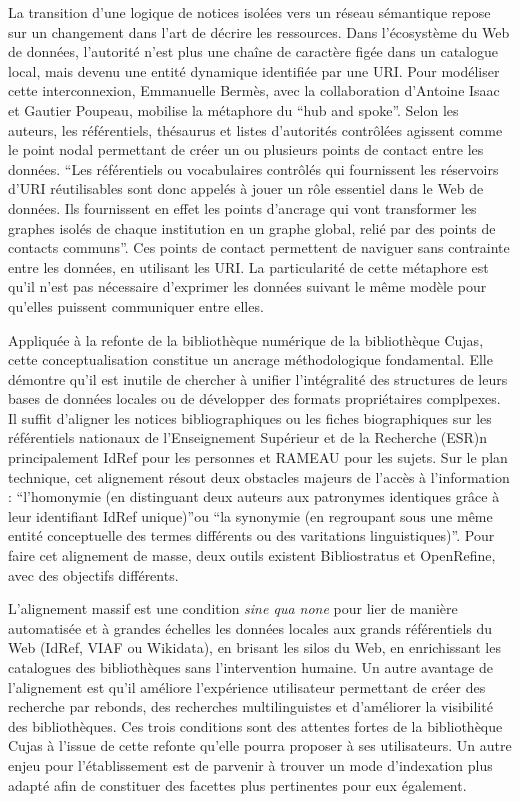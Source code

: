 La transition d'une logique de notices isolées vers un réseau sémantique repose sur un changement dans l'art de décrire les ressources. Dans l'écosystème du Web de données, l'autorité n'est plus une chaîne de caractère figée dans un catalogue local, mais devenu une entité dynamique identifiée par une URI. Pour modéliser cette interconnexion, Emmanuelle Bermès, avec la collaboration d'Antoine Isaac et Gautier Poupeau, mobilise la métaphore du \enquote{hub and spoke}. Selon les auteurs, les référentiels, thésaurus et listes d'autorités contrôlées agissent comme le point nodal permettant de créer un ou plusieurs points de contact entre les données. \enquote{Les référentiels ou vocabulaires contrôlés qui fournissent les réservoirs d’URI réutilisables sont donc appelés à jouer un rôle essentiel dans le Web de données. Ils fournissent en effet les points d’ancrage qui vont transformer les graphes isolés de chaque institution en un graphe global, relié par des points de contacts communs}. Ces points de contact permettent de naviguer sans contrainte entre les données, en utilisant les URI. La particularité de cette métaphore est qu'il n'est pas nécessaire d'exprimer les données suivant le même modèle pour qu'elles puissent communiquer entre elles.

Appliquée à la refonte de la bibliothèque numérique de la bibliothèque Cujas, cette conceptualisation constitue un ancrage méthodologique fondamental. Elle démontre qu'il est inutile de chercher à unifier l'intégralité des structures de leurs bases de données locales ou de développer des formats propriétaires complpexes. Il suffit d'aligner les notices bibliographiques ou les fiches biographiques sur les référentiels nationaux de l'Enseignement Supérieur et de la Recherche (ESR)n principalement IdRef pour les personnes et RAMEAU pour les sujets. Sur le plan technique, cet alignement résout deux obstacles majeurs de l'accès à l'information : \enquote{l'homonymie (en distinguant deux auteurs aux patronymes identiques grâce à leur identifiant IdRef unique)}ou \enquote{la synonymie (en regroupant sous une même entité conceptuelle des termes différents ou des varitations linguistiques)}. Pour faire cet alignement de masse, deux outils existent Bibliostratus  et OpenRefine, avec des objectifs différents. 

L'alignement massif est une condition \textit{sine qua none} pour lier de manière automatisée et à grandes échelles les données locales aux grands référentiels du Web (IdRef, VIAF ou Wikidata), en brisant les silos du Web, en enrichissant les catalogues des bibliothèques sans l'intervention humaine. Un autre avantage de l'alignement est qu'il améliore l'expérience utilisateur permettant de créer des recherche par rebonds, des recherches multilinguistes et d'améliorer la visibilité des bibliothèques. Ces trois conditions sont des attentes fortes de la bibliothèque Cujas à l'issue de cette refonte qu'elle pourra proposer à ses utilisateurs. Un autre enjeu pour l'établissement est de parvenir à trouver un mode d'indexation plus adapté afin de constituer des facettes plus pertinentes pour eux également.

